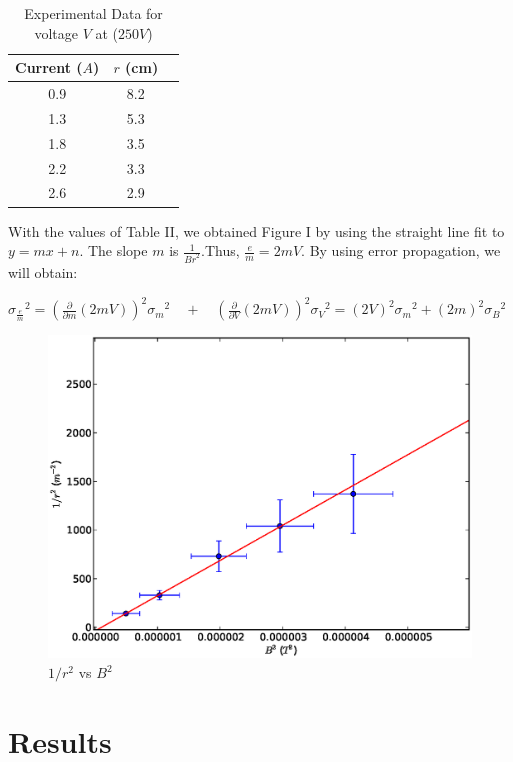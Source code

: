 \documentclass[aps,nofootinbib,onecolumn,groupedaddress,a4paper]{revtex4}
\begin{document}
\begin{table}[htdp]
\caption{ Experimental Data for voltage $V$ at ($250V$)}
\label{rawdata}
\centering
\begin{tabular}{ccc}
\\
Current ($A$)  & $r$ (cm)  \\
\hline
0.9 &  8.2   \\
1.3 &  5.3   \\
1.8 &  3.5   \\
2.2 &  3.3   \\
2.6 &  2.9   
\end{tabular}
\label{default}
\end{table}%

With the values of Table II, we obtained Figure I by using the straight line fit to $y=mx+n$. The slope $m$ is $\frac{1}{{Br}^{2}}$.Thus, $\frac{e}{m}=2mV$. By using error propagation, we will obtain:

\begin{center}

${ { \sigma  }_{ \frac { e }{ m }  } }^{ 2 }={ \left( \frac { \partial  }{ \partial m } \left( 2mV \right)  \right)  }^{ 2 }{ { \sigma  }_{ m } }^{ 2 }\quad +\quad { \left( \frac { \partial  }{ \partial V } \left( 2mV \right)  \right)  }^{ 2 }{ { \sigma  }_{ V } }^{ 2 }={ \left( 2V \right)  }^{ 2 }{ { \sigma  }_{ m } }^{ 2 }+{ \left( 2m \right)  }^{ 2 }{ { \sigma  }_{ B } }^{ 2 }$

\end{center}


\begin{figure}[h]
\caption{$1/{r}^{2}$ vs ${B}^{2}$  \label{rawplot}}
\includegraphics[width=0.5 \columnwidth]{fixedv.eps}
\end{figure}






\section{Results}
\end{document}

